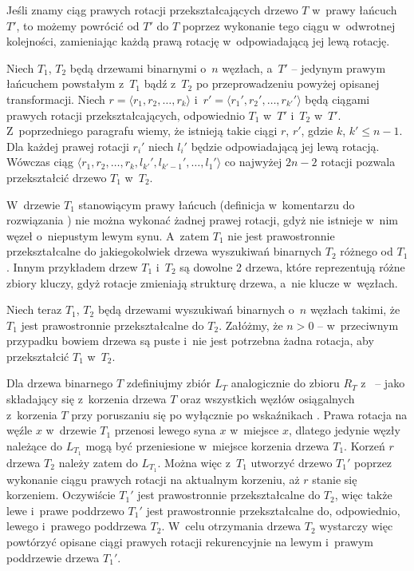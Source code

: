 Jeśli znamy ciąg prawych rotacji przekształcających drzewo $T$ w~prawy łańcuch $T'$, to możemy powrócić od $T'$ do $T$ poprzez wykonanie tego ciągu w~odwrotnej kolejności, zamieniając każdą prawą rotację w~odpowiadającą jej lewą rotację.

Niech $T_1$, $T_2$ będą drzewami binarnymi o~$n$ węzłach, a~$T'$ -- jedynym prawym łańcuchem powstałym z~$T_1$ bądź z~$T_2$ po przeprowadzeniu powyżej opisanej transformacji.
Niech $r=\langle r_1,r_2,\dots,r_k\rangle$ i~$r'=\langle r_1',r_2',\dots,r_{k'}'\rangle$ będą ciągami prawych rotacji przekształcających, odpowiednio $T_1$ w~$T'$ i~$T_2$ w~$T'$.
Z~poprzedniego paragrafu wiemy, że istnieją takie ciągi $r$, $r'$, gdzie $k$, $k'\le n-1$.
Dla każdej prawej rotacji $r_i'$ niech $l_i'$ będzie odpowiadającą jej lewą rotacją.
Wówczas ciąg $\langle r_1,r_2,\dots,r_k,l_{k'}',l_{k'-1}',\dots,l_1'\rangle$ co najwyżej $2n-2$ rotacji pozwala przekształcić drzewo $T_1$ w~$T_2$.

\exercise %

\noindent W~drzewie $T_1$ stanowiącym prawy łańcuch (definicja w~komentarzu do rozwiązania ) nie można wykonać żadnej prawej rotacji, gdyż nie istnieje w~nim węzeł o~niepustym lewym synu.
A~zatem $T_1$ nie jest prawostronnie przekształcalne do jakiegokolwiek drzewa wyszukiwań binarnych $T_2$ różnego od $T_1$.
Innym przykładem drzew $T_1$ i~$T_2$ są dowolne 2 drzewa, które reprezentują różne zbiory kluczy, gdyż rotacje zmieniają strukturę drzewa, a~nie klucze w~węzłach.

Niech teraz $T_1$, $T_2$ będą drzewami wyszukiwań binarnych o~$n$ węzłach takimi, że $T_1$ jest prawostronnie przekształcalne do $T_2$.
Załóżmy, że $n>0$ -- w~przeciwnym przypadku bowiem drzewa są puste i~nie jest potrzebna żadna rotacja, aby przekształcić $T_1$ w~$T_2$.

Dla drzewa binarnego $T$ zdefiniujmy zbiór $L_T$ analogicznie do zbioru $R_T$ z~ -- jako składający się z~korzenia drzewa $T$ oraz wszystkich węzłów osiągalnych z~korzenia $T$ przy poruszaniu się po wyłącznie po wskaźnikach .
Prawa rotacja na węźle $x$ w~drzewie $T_1$ przenosi lewego syna $x$ w~miejsce $x$, dlatego jedynie węzły należące do $L_{T_1}$ mogą być przeniesione w~miejsce korzenia drzewa $T_1$.
Korzeń $r$ drzewa $T_2$ należy zatem do $L_{T_1}$.
Można więc z~$T_1$ utworzyć drzewo $T_1'$ poprzez wykonanie ciągu prawych rotacji na aktualnym korzeniu, aż $r$ stanie się korzeniem.
Oczywiście $T_1'$ jest prawostronnie przekształcalne do $T_2$, więc także lewe i~prawe poddrzewo $T_1'$ jest prawostronnie przekształcalne do, odpowiednio, lewego i~prawego poddrzewa $T_2$.
W~celu otrzymania drzewa $T_2$ wystarczy więc powtórzyć opisane ciągi prawych rotacji rekurencyjnie na lewym i~prawym poddrzewie drzewa $T_1'$.


